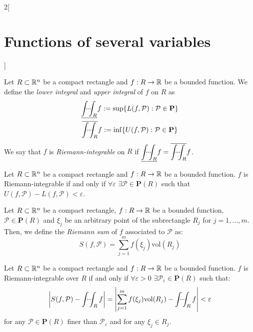 \documentclass[../../../main_math.tex]{subfiles}
\begin{document}
\begin{multicols}{2}[\section{Functions of several variables}]
\begin{definition}
  \end{definition}
  \begin{definition}
    Let $R\subset\mathbb{R}^n$ be a compact rectangle and $f:R\rightarrow\mathbb{R} $ be a bounded function. We define the \emph{lower integral} and \emph{upper integral} of $f$ on $R$ as
    \begin{gather*}
      \underline{\dotsint_{R}}f:=\sup\{L(f,\mathcal{P}):\mathcal{P}\in\textbf{P}\}\\
      \overline{\dotsint_{R}}f:=\inf\{U(f,\mathcal{P}):\mathcal{P}\in\textbf{P}\}
    \end{gather*} We say that $f$ is \emph{Riemann-integrable} on $R$ if $\displaystyle\underline{\dotsint_{R}}f=\overline{\dotsint_{R}}f$.
  \end{definition}
  \begin{proposition}
    Let $R\subset\mathbb{R}^n$ be a compact rectangle and $f:R\rightarrow\mathbb{R} $ be a bounded function. $f$ is Riemann-integrable if and only if $\forall\varepsilon$ $\exists\mathcal{P}\in\textbf{P}(R)$ such that $U(f,\mathcal{P})-L(f,\mathcal{P})<\varepsilon$.
  \end{proposition}
  \begin{definition}
    Let $R\subset\mathbb{R}^n$ be a compact rectangle, $f:R\rightarrow\mathbb{R} $ be a bounded function, $\mathcal{P}\in\textbf{P}(R)$ and $\xi_j$ be an arbitrary point of the subrectangle $R_j$ for $j=1,\ldots,m$. Then, we define the \emph{Riemann sum} of $f$ associated to $\mathcal{P}$ as: $$S(f,\mathcal{P})=\sum_{j=1}^mf(\xi_j)\text{vol}(R_j)$$
  \end{definition}
  \begin{theorem}
    Let $R\subset\mathbb{R}^n$ be a compact rectangle and $f:R\rightarrow\mathbb{R} $ be a bounded function. $f$ is Riemann-integrable over $R$ if and only if $\forall\varepsilon>0$ $\exists\mathcal{P}_\varepsilon\in\textbf{P}(R)$ such that: $$\left|S(f,\mathcal{P})-\dotsint_Rf\right|=\left|\sum_{j=1}^mf(\xi_j)\text{vol}(R_j)-\dotsint_Rf\right|<\varepsilon$$ for any $\mathcal{P}\in\textbf{P}(R)$ finer than $\mathcal{P}_\varepsilon$ and for any $\xi_j\in R_j$.
  \end{theorem}

\end{multicols}
\end{document}
